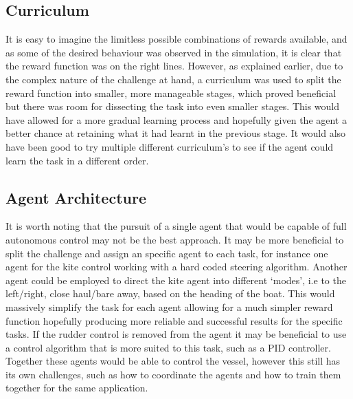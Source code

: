 \subsection*{Curriculum}

It is easy to imagine the limitless possible combinations of rewards available, and as some of the desired behaviour was observed in the simulation, it is clear that the reward function was on the right lines. However, as explained earlier, due to the complex nature of the challenge at hand, a curriculum was used to split the reward function into smaller, more manageable stages, which proved beneficial but there was room for dissecting the task into even smaller stages. This would have allowed for a more gradual learning process and hopefully given the agent a better chance at retaining what it had learnt in the previous stage. It would also have been good to try multiple different curriculum's to see if the agent could learn the task in a different order.

\subsection*{Agent Architecture}
It is worth noting that the pursuit of a single agent that would be capable of full autonomous control may not be the best approach. It may be more beneficial to split the challenge and assign an specific agent to each task, for instance one agent for the kite control working with a hard coded steering algorithm. Another agent could be employed to direct the kite agent into different `modes', i.e to the left/right, close haul/bare away, based on the heading of the boat. This would massively simplify the task for each agent allowing for a much simpler reward function hopefully producing more reliable and successful results for the specific tasks. If the rudder control is removed from the agent it may be beneficial to use a control algorithm that is more suited to this task, such as a PID controller. Together these agents would be able to control the vessel, however this still has its own challenges, such as how to coordinate the agents and how to train them together for the same application. 



